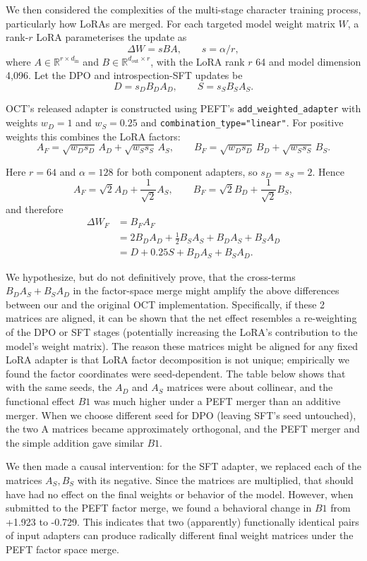 \documentclass{article}
\begin{document}
We then considered the complexities of the multi-stage character training process, particularly how LoRAs are merged. For each targeted model weight matrix $W$, a rank-$r$ LoRA parameterises the update as
\[
\Delta W = sBA, \qquad s=\alpha/r,
\]
where $A\in\mathbb{R}^{r\times d_{\mathrm{in}}}$ and
$B\in\mathbb{R}^{d_{\mathrm{out}}\times r}$, with the LoRA rank $r$ 64 and model dimension 4,096.  Let the DPO and
introspection-SFT updates be
\[
D=s_D B_DA_D,\qquad S=s_S B_SA_S.
\]

OCT's released adapter is constructed using PEFT's
\texttt{add\_weighted\_adapter} with weights $w_D=1$ and $w_S=0.25$
and \texttt{combination\_type="linear"}.  For positive weights this
combines the LoRA factors:
\[
A_F=
\sqrt{w_Ds_D}\,A_D+\sqrt{w_Ss_S}\,A_S,
\qquad
B_F=
\sqrt{w_Ds_D}\,B_D+\sqrt{w_Ss_S}\,B_S.
\]

Here $r=64$ and $\alpha=128$ for both component adapters, so
$s_D=s_S=2$. Hence
\[
A_F=\sqrt{2}A_D+\frac{1}{\sqrt{2}}A_S,
\qquad
B_F=\sqrt{2}B_D+\frac{1}{\sqrt{2}}B_S,
\]
and therefore
\[
\begin{aligned}
\Delta W_F
&=B_FA_F\\
&=2B_DA_D+\frac{1}{2}B_SA_S+B_DA_S+B_SA_D\\
&=D+0.25S+B_DA_S+B_SA_D.
\end{aligned}
\]

We hypothesize, but do not definitively prove, that the cross-terms $B_DA_S + B_SA_D$ in the factor-space merge might amplify the above differences between our and the original OCT implementation. Specifically, if these 2 matrices are aligned, it can be shown that the net effect resembles a re-weighting of the DPO or SFT stages (potentially increasing the LoRA's contribution to the model's weight matrix). The reason these matrices might be aligned for any fixed LoRA adapter is that LoRA factor decomposition is not unique; empirically we found the factor coordinates were seed-dependent. The table below shows that with the same seeds, the $A_D$ and $A_S$ matrices were about collinear, and the functional effect $B1$ was much higher under a PEFT merger than an additive merger. When we choose different seed for DPO (leaving SFT's seed untouched), the two A matrices became approximately orthogonal, and the PEFT merger and the simple addition gave similar $B1$.

We then made a causal intervention: for the SFT adapter, we replaced each of the matrices $A_S, B_S$ with its negative. Since the matrices are multiplied, that should have had no effect on the final weights or behavior of the model. However, when submitted to the PEFT factor merge, we found a behavioral change in $B1$ from +1.923 to -0.729. This indicates that two (apparently) functionally identical pairs of input adapters can produce radically different final weight matrices under the PEFT factor space merge.
\end{document}
